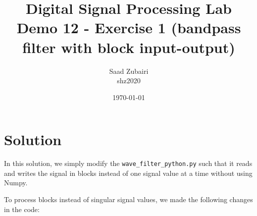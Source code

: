 \documentclass[11pt]{article}
\title{
    \vspace{3em}
    \textbf{Digital Signal Processing Lab}\\
    Demo 12 - Exercise 1 (bandpass filter with block input-output)
    \vspace{1em}
}
\author{
    Saad Zubairi \\ 
    shz2020 \\
    \vspace{1em}
}
\date{\today}
\begin{document}
\maketitle	

\pagebreak



\section*{Solution}

In this solution, we simply modify the \texttt{wave\_filter\_python.py} such that it reads and writes the signal in blocks instead of one signal value at a time without using Numpy. 

To process blocks instead of singular signal values, we made the following changes in the code:
\end{document}
